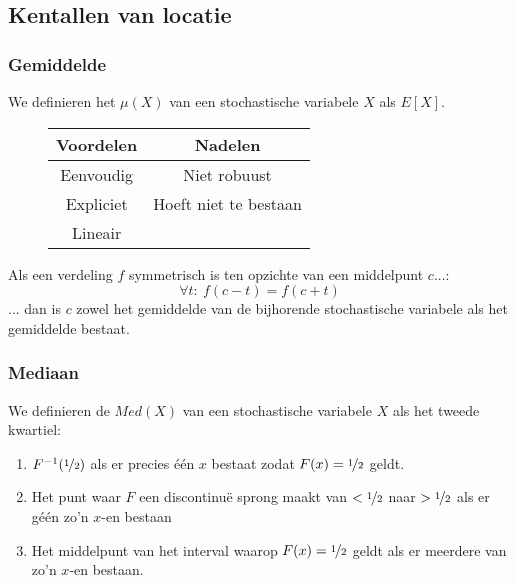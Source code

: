 \documentclass[main.tex]{subfiles}
\begin{document}
\subsection{Kentallen van locatie}
\label{sec:kent-van-locat}

\subsubsection{Gemiddelde}
\label{sec:gemiddelde}

\begin{de}
  We definieren het  $\mu(X)$ van een stochastische variabele $X$ als $E[X]$.
\end{de}

\begin{figure}[H]
  \centering
  \begin{tabular}{|c|c|}
    \hline
    Voordelen & Nadelen\\
    \hline \hline
    Eenvoudig & Niet robuust\\
    Expliciet & Hoeft niet te bestaan\\
    Lineair &\\
    \hline
  \end{tabular}
\end{figure}

\begin{st}
  Als een verdeling $f$ symmetrisch is ten opzichte van een middelpunt $c$...:
  \[ \forall t:\ f(c-t) = f(c+t) \]
  ... dan is $c$ zowel het gemiddelde van de bijhorende stochastische variabele als het gemiddelde bestaat.
\end{st}


\subsubsection{Mediaan}
\label{sec:mediaan}

\begin{de}
  We definieren de  $Med(X)$ van een stochastische variabele $X$ als het tweede kwartiel:
  \begin{enumerate}
  \item $F^{-1}(\nicefrac{1}{2})$ als er precies \'e\'en $x$ bestaat zodat $F(x) = \nicefrac{1}{2}$ geldt.
  \item Het punt waar $F$ een discontinu\"e sprong maakt van $<\nicefrac{1}{2}$ naar $>\nicefrac{1}{2}$ als er g\'e\'en zo'n $x$-en bestaan
  \item Het middelpunt van het interval waarop $F(x) = \nicefrac{1}{2}$ geldt als er meerdere van zo'n $x$-en bestaan.
  \end{enumerate}
\end{de}
\end{document}
